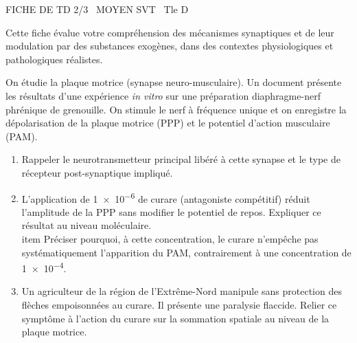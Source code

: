 \documentclass[11pt]{article}
\begin{document}
\begin{tcolorbox}[enhanced,colback=popink,colframe=popink,arc=10pt,boxrule=0pt,left=12pt,right=12pt,top=9pt,bottom=9pt]
{\color{white}\popxbold\small FICHE DE TD 2/3 \textbullet\ MOYEN \hfill SVT \textbullet\ Tle D\par}
\end{tcolorbox}
\vspace{4pt}
Cette fiche évalue votre compréhension des mécanismes synaptiques et de leur modulation par des substances exogènes, dans des contextes physiologiques et pathologiques réalistes.

\begin{exercice}
On étudie la plaque motrice (synapse neuro-musculaire). Un document présente les résultats d'une expérience \textit{in vitro} sur une préparation diaphragme-nerf phrénique de grenouille. On stimule le nerf à fréquence unique et on enregistre la dépolarisation de la plaque motrice (PPP) et le potentiel d'action musculaire (PAM).

\begin{enumerate}
    \item Rappeler le neurotransmetteur principal libéré à cette synapse et le type de récepteur post-synaptique impliqué.
    \item L'application de \SI{1e-6}{\molar} de curare (antagoniste compétitif) réduit l'amplitude de la PPP sans modifier le potentiel de repos. Expliquer ce résultat au niveau moléculaire.
    \\item Préciser pourquoi, à cette concentration, le curare n'empêche pas systématiquement l'apparition du PAM, contrairement à une concentration de \SI{1e-4}{\molar}.
    \item Un agriculteur de la région de l'Extrême-Nord manipule sans protection des flèches empoisonnées au curare. Il présente une paralysie flaccide. Relier ce symptôme à l'action du curare sur la sommation spatiale au niveau de la plaque motrice.
\end{enumerate}
\end{exercice}
\end{document}
